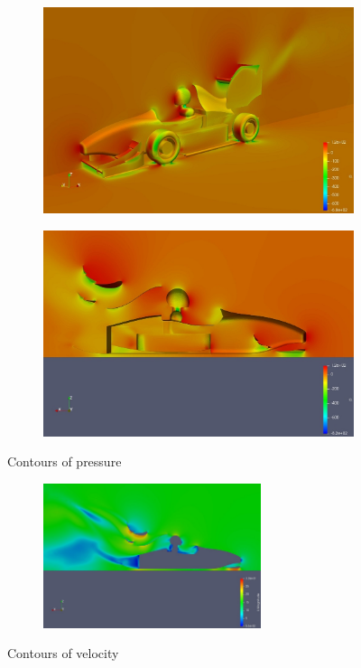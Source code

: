 \begin{figure}[h!]
\begin{subfigure}[b]{0.48\textwidth}
    \end{subfigure}
    \begin{subfigure}[b]{0.48\textwidth}
    \includegraphics[width=\textwidth]{cis3.jpg}
    \end{subfigure}
    \begin{subfigure}[b]{0.48\textwidth}
    	\includegraphics[width=\textwidth]{cis_sym.jpg}
    \end{subfigure}
    \caption{Contours of pressure}
    \begin{subfigure}[b]{0.7\textwidth}
    \centering
    	\includegraphics[width=0.7\textwidth]{vel.jpg}
    \end{subfigure}
    \caption{Contours of velocity}
\end{figure}

